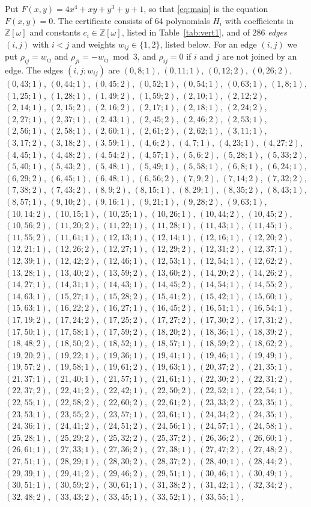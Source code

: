 \documentclass[11pt]{article}
\newcommand{\Z}{\mathbb{Z}}
\begin{document}
Put $F(x,y)=4x^{4}+xy+y^{3}+y+1$, so that \eqref{eq:main} is the equation $F(x,y)=0$. The certificate consists of 64 polynomials $H_i$ with coefficients in $\Z[\omega]$ and constants $c_i\in\Z[\omega]$, listed in Table~\ref{tab:vert1}, and of 286 \emph{edges} $(i,j)$ with $i<j$ and weights $w_{ij}\in\{1,2\}$, listed below. For an edge $(i,j)$ we put $\rho_{ij}=w_{ij}$ and $\rho_{ji}=-w_{ij}\bmod 3$, and $\rho_{ij}=0$ if $i$ and $j$ are not joined by an edge.
The edges $(i,j;w_{ij})$ are $(0,8;1)$, $(0,11;1)$, $(0,12;2)$, $(0,26;2)$, $(0,43;1)$, $(0,44;1)$, $(0,45;2)$, $(0,52;1)$, $(0,54;1)$, $(0,63;1)$, $(1,8;1)$, $(1,25;1)$, $(1,28;1)$, $(1,49;2)$, $(1,59;2)$, $(2,10;1)$, $(2,12;2)$, $(2,14;1)$, $(2,15;2)$, $(2,16;2)$, $(2,17;1)$, $(2,18;1)$, $(2,24;2)$, $(2,27;1)$, $(2,37;1)$, $(2,43;1)$, $(2,45;2)$, $(2,46;2)$, $(2,53;1)$, $(2,56;1)$, $(2,58;1)$, $(2,60;1)$, $(2,61;2)$, $(2,62;1)$, $(3,11;1)$, $(3,17;2)$, $(3,18;2)$, $(3,59;1)$, $(4,6;2)$, $(4,7;1)$, $(4,23;1)$, $(4,27;2)$, $(4,45;1)$, $(4,48;2)$, $(4,54;2)$, $(4,57;1)$, $(5,6;2)$, $(5,28;1)$, $(5,33;2)$, $(5,40;1)$, $(5,43;2)$, $(5,48;1)$, $(5,49;1)$, $(5,58;1)$, $(6,8;1)$, $(6,24;1)$, $(6,29;2)$, $(6,45;1)$, $(6,48;1)$, $(6,56;2)$, $(7,9;2)$, $(7,14;2)$, $(7,32;2)$, $(7,38;2)$, $(7,43;2)$, $(8,9;2)$, $(8,15;1)$, $(8,29;1)$, $(8,35;2)$, $(8,43;1)$, $(8,57;1)$, $(9,10;2)$, $(9,16;1)$, $(9,21;1)$, $(9,28;2)$, $(9,63;1)$, $(10,14;2)$, $(10,15;1)$, $(10,25;1)$, $(10,26;1)$, $(10,44;2)$, $(10,45;2)$, $(10,56;2)$, $(11,20;2)$, $(11,22;1)$, $(11,28;1)$, $(11,43;1)$, $(11,45;1)$, $(11,55;2)$, $(11,61;1)$, $(12,13;1)$, $(12,14;1)$, $(12,16;1)$, $(12,20;2)$, $(12,21;1)$, $(12,26;2)$, $(12,27;1)$, $(12,29;2)$, $(12,31;2)$, $(12,37;1)$, $(12,39;1)$, $(12,42;2)$, $(12,46;1)$, $(12,53;1)$, $(12,54;1)$, $(12,62;2)$, $(13,28;1)$, $(13,40;2)$, $(13,59;2)$, $(13,60;2)$, $(14,20;2)$, $(14,26;2)$, $(14,27;1)$, $(14,31;1)$, $(14,43;1)$, $(14,45;2)$, $(14,54;1)$, $(14,55;2)$, $(14,63;1)$, $(15,27;1)$, $(15,28;2)$, $(15,41;2)$, $(15,42;1)$, $(15,60;1)$, $(15,63;1)$, $(16,22;2)$, $(16,27;1)$, $(16,45;2)$, $(16,51;1)$, $(16,54;1)$, $(17,19;2)$, $(17,24;2)$, $(17,25;2)$, $(17,27;2)$, $(17,30;2)$, $(17,31;2)$, $(17,50;1)$, $(17,58;1)$, $(17,59;2)$, $(18,20;2)$, $(18,36;1)$, $(18,39;2)$, $(18,48;2)$, $(18,50;2)$, $(18,52;1)$, $(18,57;1)$, $(18,59;2)$, $(18,62;2)$, $(19,20;2)$, $(19,22;1)$, $(19,36;1)$, $(19,41;1)$, $(19,46;1)$, $(19,49;1)$, $(19,57;2)$, $(19,58;1)$, $(19,61;2)$, $(19,63;1)$, $(20,37;2)$, $(21,35;1)$, $(21,37;1)$, $(21,40;1)$, $(21,57;1)$, $(21,61;1)$, $(22,30;2)$, $(22,31;2)$, $(22,37;2)$, $(22,41;2)$, $(22,42;1)$, $(22,50;2)$, $(22,52;1)$, $(22,54;1)$, $(22,55;1)$, $(22,58;2)$, $(22,60;2)$, $(22,61;2)$, $(23,33;2)$, $(23,35;1)$, $(23,53;1)$, $(23,55;2)$, $(23,57;1)$, $(23,61;1)$, $(24,34;2)$, $(24,35;1)$, $(24,36;1)$, $(24,41;2)$, $(24,51;2)$, $(24,56;1)$, $(24,57;1)$, $(24,58;1)$, $(25,28;1)$, $(25,29;2)$, $(25,32;2)$, $(25,37;2)$, $(26,36;2)$, $(26,60;1)$, $(26,61;1)$, $(27,33;1)$, $(27,36;2)$, $(27,38;1)$, $(27,47;2)$, $(27,48;2)$, $(27,51;1)$, $(28,29;1)$, $(28,30;2)$, $(28,37;2)$, $(28,40;1)$, $(28,44;2)$, $(29,39;1)$, $(29,41;2)$, $(29,46;2)$, $(29,51;1)$, $(30,46;1)$, $(30,49;1)$, $(30,51;1)$, $(30,59;2)$, $(30,61;1)$, $(31,38;2)$, $(31,42;1)$, $(32,34;2)$, $(32,48;2)$, $(33,43;2)$, $(33,45;1)$, $(33,52;1)$, $(33,55;1)$, 
\end{document}
